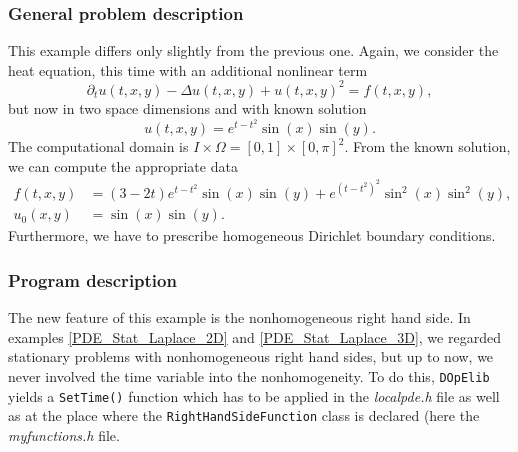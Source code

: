 \subsubsection{General problem description}

This example differs only slightly from the previous one. Again, we consider the heat equation, this time with an additional nonlinear term
\begin{equation*}
\partial_t u(t,x,y) - \Delta u(t,x,y) + u(t,x,y)^2 = f(t,x,y),
\end{equation*}
but now in two space dimensions and with known solution 
\begin{equation*}
u(t,x,y) = e^{t-t^2} \sin(x) \sin(y).
\end{equation*}
The computational domain is $I\times\Omega = [0,1]\times [0,\pi]^2$. From the known solution, we can compute the appropriate data 
\begin{align*}
f(t,x,y) &= (3-2t)e^{t-t^2} \sin(x) \sin(y) + e^{(t-t^2)^2} \sin^2(x) \sin^2(y),\\
u_0(x,y) &= \sin(x) \sin(y).
\end{align*}
Furthermore, we have to prescribe homogeneous Dirichlet boundary conditions.

\subsubsection{Program description}

The new feature of this example is the nonhomogeneous right hand side. In examples \ref{PDE_Stat_Laplace_2D} and \ref{PDE_Stat_Laplace_3D}, we regarded stationary problems with nonhomogeneous right hand sides, but up to now, we never involved the time variable into the nonhomogeneity. To do this, \texttt{DOpElib} yields a \texttt{SetTime()} function which has to be applied in the \textit{localpde.h} file as well as at the place where the \texttt{RightHandSideFunction} class is declared (here the \textit{myfunctions.h} file.
